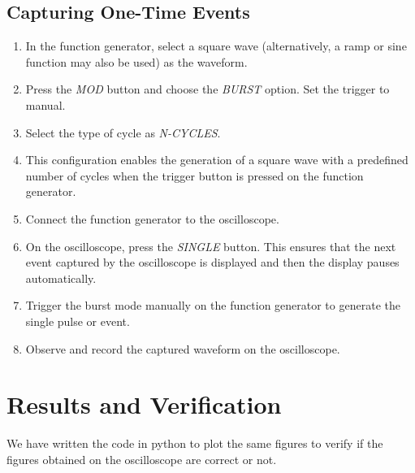 \documentclass[a4paper,12pt]{article}
\begin{document}
\subsection*{Capturing One-Time Events}
\begin{enumerate}
    	\item In the function generator, select a square wave (alternatively, a ramp or sine function may also be used) as the waveform.
    	\item Press the \textit{MOD} button and choose the \textit{BURST} option. Set the trigger to manual.
	\item Select the type of cycle as \textit{N-CYCLES}.
    	\item This configuration enables the generation of a square wave with a predefined number of cycles when the trigger button is pressed on the function generator.
    	\item Connect the function generator to the oscilloscope.
	\item On the oscilloscope, press the \textit{SINGLE} button. This ensures that the next event captured by the oscilloscope is displayed and then the display pauses automatically.
    	\item Trigger the burst mode manually on the function generator to generate the single pulse or event.
    	\item Observe and record the captured waveform on the oscilloscope.
\end{enumerate}
\section*{Results and Verification}
We have written the code in python to plot the same figures to verify if the figures obtained on the oscilloscope are correct or not.\\
\end{document}
